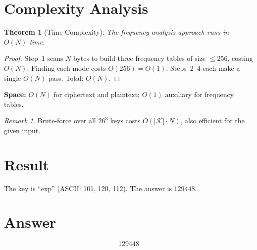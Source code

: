 \documentclass[12pt,a4paper]{article}
\newtheorem{theorem}{Theorem}
\theoremstyle{definition}
\theoremstyle{remark}
\newtheorem*{remark}{Remark}
\begin{document}
\section{Complexity Analysis}

\begin{theorem}[Time Complexity]
The frequency-analysis approach runs in $O(N)$ time.
\end{theorem}

\begin{proof}
Step~1 scans $N$ bytes to build three frequency tables of size $\leq 256$, costing $O(N)$. Finding each mode costs $O(256) = O(1)$. Steps~2--4 each make a single $O(N)$ pass. Total: $O(N)$.
\end{proof}

\noindent\textbf{Space:} $O(N)$ for ciphertext and plaintext; $O(1)$ auxiliary for frequency tables.

\begin{remark}
Brute-force over all $26^3$ keys costs $O(|\mathcal{K}| \cdot N)$, also efficient for the given input.
\end{remark}

\section{Result}
The key is ``exp'' (ASCII: 101, 120, 112). The answer is $\boxed{129448}$.

\section{Answer}

\[
\boxed{129448}
\]
\end{document}
